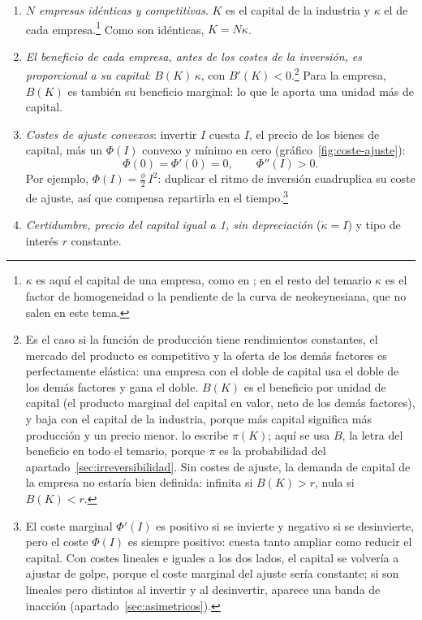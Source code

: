 \documentclass[11pt]{article}
\begin{document}
\begin{enumerate}
\item \emph{$N$ empresas idénticas y competitivas}. $K$ es el capital de la industria y $\kappa$ el de cada empresa.\footnote{$\kappa$ es aquí el capital de una empresa, como en \textcite{Romer2019Advanced}; en el resto del temario $\kappa$ es el factor de homogeneidad o la pendiente de la curva de  neokeynesiana, que no salen en este tema.} Como son idénticas, $K=N\kappa$.
\item \emph{El beneficio de cada empresa, antes de los costes de la inversión, es proporcional a su capital}: $B(K)\,\kappa$, con $B'(K)<0$.\footnote{Es el caso si la función de producción tiene rendimientos constantes, el mercado del producto es competitivo y la oferta de los demás factores es perfectamente elástica: una empresa con el doble de capital usa el doble de los demás factores y gana el doble. $B(K)$ es el beneficio por unidad de capital (el producto marginal del capital en valor, neto de los demás factores), y baja con el capital de la industria, porque más capital significa más producción y un precio menor. \textcite{Romer2019Advanced} lo escribe $\pi(K)$; aquí se usa $B$, la letra del beneficio en todo el temario, porque $\pi$ es la probabilidad del apartado~\ref{sec:irreversibilidad}. Sin costes de ajuste, la demanda de capital de la empresa no estaría bien definida: infinita si $B(K)>r$, nula si $B(K)<r$.} Para la empresa, $B(K)$ es también su beneficio marginal: lo que le aporta una unidad más de capital.
\item \emph{Costes de ajuste convexos}: invertir $I$ cuesta $I$, el precio de los bienes de capital, más un  $\Phi({I})$ convexo y mínimo en cero (gráfico~\ref{fig:coste-ajuste}):
  \begin{equation*}
  \Phi(0)=\Phi'(0)=0,\qquad \Phi''(I)>0.
  \end{equation*}
  Por ejemplo, $\Phi({I})=\tfrac{\phi}{2}\,I^2$: duplicar el ritmo de inversión cuadruplica su coste de ajuste, así que compensa repartirla en el tiempo.\footnote{El coste marginal $\Phi'({I})$ es positivo si se invierte y negativo si se desinvierte, pero el coste $\Phi({I})$ es siempre positivo: cuesta tanto ampliar como reducir el capital. Con costes lineales e iguales a los dos lados, el capital se volvería a ajustar de golpe, porque el coste marginal del ajuste sería constante; si son lineales pero distintos al invertir y al desinvertir, aparece una banda de inacción (apartado~\ref{sec:asimetricos}).}
\item \emph{Certidumbre, precio del capital igual a 1, sin depreciación} ($\dot\kappa=I$) y tipo de interés $r$ constante.
\end{enumerate}
\end{document}
